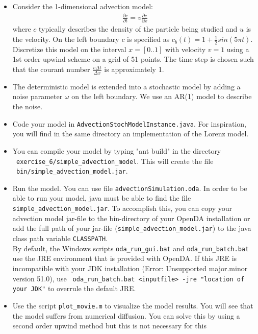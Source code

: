 \documentclass[a4paper,10pt]{article}
\begin{document}
\begin{itemize}
\item Consider the 1-dimensional advection model:
   \begin{eqnarray}
      \frac{\partial c}{\partial t}=v \frac{\partial c}{\partial x}
   \end{eqnarray}
   where $c$ typically describes the density of the particle being studied and
   $u$ is the velocity. On the left boundary $c$ is specified as
   $c_b(t)=1+\frac{1}{2}sin(5 \pi t)$. Discretize this model on the interval
   $x=[0..1]$ with velocity $v=1$ using a 1st order upwind scheme on a grid of
   51 points. The time step is chosen such that the courant number $\frac{v
     \Delta t}{\Delta x}$ is approximately 1.
\item The deterministic model is extended into a stochastic model by adding a
  noise parameter $\omega$ on the left boundary. We use an AR(1) model to
  describe the noise.
\item Code your model in {\tt AdvectionStochModelInstance.java}. For
  inspiration, you will find in the same directory an implementation of the
  Lorenz model.
\item You can compile your model by typing "ant build" in the directory \\ {\tt
  exercise\_6/simple\_advection\_model}. This will create the file \\ {\tt
  bin/simple\_advection\_model.jar}.
\item Run the model. You can use file {\tt advectionSimulation.oda}. In order
  to be able to run your model, java must be able to find the file {\tt
    simple\_advection\_model.jar}. To accomplish this, you can copy your
  advection model jar-file to the bin-directory of your OpenDA installation or
  add the full path of your jar-file ({\tt simple\_advection\_model.jar}) to
  the java class path variable {\tt CLASSPATH}.\\ By default, the Windows
  scripts {\tt oda\_run\_gui.bat} and {\tt oda\_run\_batch.bat} use the JRE
  environment that is provided with OpenDA. If this JRE is incompatible with
  your JDK installation (Error: Unsupported major.minor version 51.0), use {\tt
    oda\_run\_batch.bat <inputfile> -jre "location of your JDK"} to overrule
  the default JRE.
\item Use the script {\tt plot\_movie.m} to visualize the model results. You
  will see that the model suffers from numerical diffusion. You can solve this
  by using a second order upwind method but this is not necessary for this

\end{itemize}
\end{document}
